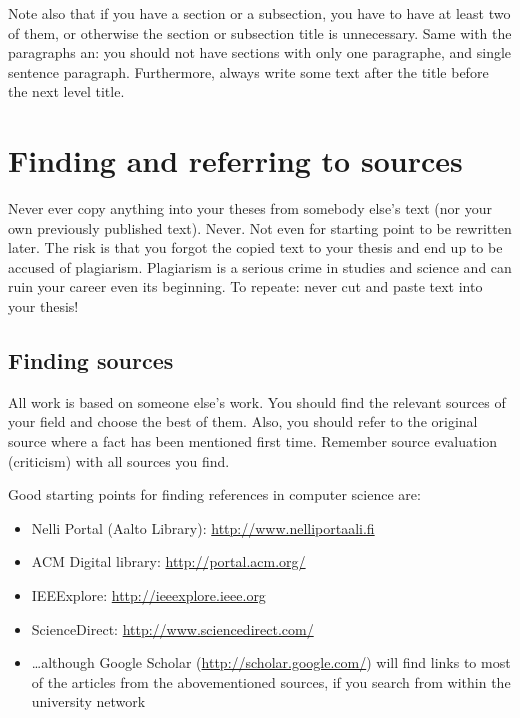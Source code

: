 \documentclass[12pt,a4paper,oneside,pdftex]{report}
\begin{document}
Note also that if you have a section or a subsection, you have to have
at least two of them, or otherwise the section or subsection title is
unnecessary. Same with the paragraphs an: you should not have sections
with only one paragraphe, and single sentence paragraph. Furthermore,
always write some text after the title before the next level title.

\section{Finding and referring to sources}

Never ever copy anything into your theses from somebody else's text
(nor your own previously published text). Never. Not even for starting
point to be rewritten later. The risk is that you forgot the copied
text to your thesis and end up to be accused of plagiarism. Plagiarism
is a serious crime in studies and science and can ruin your career
even its beginning. To repeate: never cut and paste text into your
thesis!

\subsection{Finding sources}

All work is based on someone else's work. You should find the relevant
sources of your field and choose the best of them. Also, you should
refer to the original source where a fact has been mentioned first
time. Remember source evaluation (criticism) with all sources you
find.

Good starting points for finding references in computer science are:
\begin{itemize}
\setlength{\itemsep}{0pt}
\item Nelli Portal (Aalto Library): \url{http://www.nelliportaali.fi}
\item ACM Digital library: \url{http://portal.acm.org/}
\item IEEExplore: \url{http://ieeexplore.ieee.org}
\item ScienceDirect: \url{http://www.sciencedirect.com/}
\item \ldots although Google Scholar (\url{http://scholar.google.com/}) will
find links to most of the articles from the abovementioned sources, if you
search from within the university network
\end{itemize}
\end{document}
